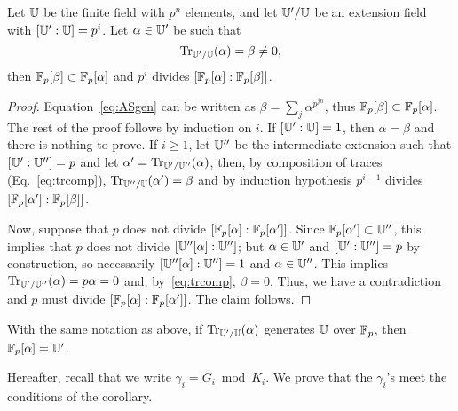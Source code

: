 \begin{lemma}
  Let $\mathbb{U}$ be the finite field with $p^n$ elements, and let $\mathbb{U}'/\mathbb{U}$
  be an extension field with $[\mathbb{U}':\mathbb{U}]=p^i$. Let $\alpha\in\mathbb{U}'$ be
  such that
  \begin{equation}
    \label{eq:ASgen}
    \operatorname{Tr}_{\mathbb{U}'/\mathbb{U}}(\alpha) = \beta \ne 0
    \text{,}
  \end{equation}
  then $\mathbb{F}_p[\beta]\subset\mathbb{F}_p[\alpha]$ and $p^i$ divides
  $\left[\mathbb{F}_p[\alpha]:\mathbb{F}_p[\beta]\right]$.
\end{lemma}
\begin{proof}
  Equation~\eqref{eq:ASgen} can be written as $\beta = \sum_j
  \alpha^{p^{jn}}$, thus $\mathbb{F}_p[\beta] \subset \mathbb{F}_p[\alpha]$.  The rest
  of the proof follows by induction on $i$. If $[\mathbb{U}':\mathbb{U}]=1$, then
  $\alpha=\beta$ and there is nothing to prove. If $i\ge1$, let $\mathbb{U}''$
  be the intermediate extension such that $[\mathbb{U}':\mathbb{U}'']=p$ and let
  $\alpha'=\operatorname{Tr}_{\mathbb{U}'/\mathbb{U}''}(\alpha)$, then, by composition of traces
  (Eq.~\ref{eq:trcomp}), $\operatorname{Tr}_{\mathbb{U}''/\mathbb{U}}(\alpha') = \beta$ and by
  induction hypothesis $p^{i-1}$ divides
  $[\mathbb{F}_p[\alpha']:\mathbb{F}_p[\beta]]$.

  Now, suppose that $p$ does not divide
  $[\mathbb{F}_p[\alpha]:\mathbb{F}_p[\alpha']]$.  Since $\mathbb{F}_p[\alpha']\subset\mathbb{U}''$,
  this implies that $p$ does not divide $[\mathbb{U}''[\alpha]:\mathbb{U}'']$; but
  $\alpha\in\mathbb{U}'$ and $[\mathbb{U}':\mathbb{U}'']=p$ by construction, so necessarily
  $[\mathbb{U}''[\alpha]:\mathbb{U}''] = 1$ and $\alpha\in\mathbb{U}''$. This implies
  $\operatorname{Tr}_{\mathbb{U}'/\mathbb{U}''}(\alpha) = p\alpha = 0$ and, by~\ref{eq:trcomp},
  $\beta=0$. Thus, we have a contradiction and $p$ must divide
  $[\mathbb{F}_p[\alpha]:\mathbb{F}_p[\alpha']]$. The claim follows.\end{proof}

\begin{corollary}
  \label{coro:gen}
  With the same notation as above, if $\operatorname{Tr}_{\mathbb{U}'/\mathbb{U}}(\alpha)$ generates
  $\mathbb{U}$ over $\mathbb{F}_p$, then $\mathbb{F}_p[\alpha] = \mathbb{U}'$.
\end{corollary}

Hereafter, recall that we write $\gamma_i=G_i \bmod K_i$. We prove
that the $\gamma_i$'s meet the conditions of the corollary.

